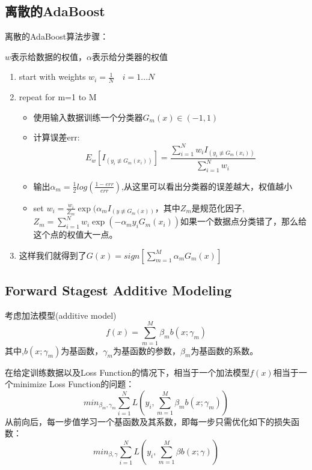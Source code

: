 	\subsection{离散的AdaBoost}
	离散的AdaBoost算法步骤：\boldmath  %

	$w$表示给数据的权值，$\alpha$表示给分类器的权值

	\begin{enumerate}		
		\item start with weights $w_i = \frac{1}{N} \quad i=1...N$
		\item repeat for m=1 to M
			\begin{itemize}
				\item 使用输入数据训练一个分类器$G_m(x) \in (-1,1)$
				\item 计算误差err:
					\begin{equation*}
						E_w[I_(y_i\not \equiv G_m(x_i))]=\frac{\sum_{i=1}^{N}w_i I_(y_i\not \equiv G_m(x_i))}{\sum_{i=1}^{N}w_i}
					\end{equation*}
				\item 输出$\alpha_m = \frac{1}{2}log(\frac{1-err}{err})$,从这里可以看出分类器的误差越大，权值越小
				\item set $w_i = \frac{w_i}{Z_m} \exp(\alpha_m I_(y\not \equiv G_m(x))$，其中$Z_m$是规范化因子,\newline
				$Z_m=\sum_{i=1}^{N}w_i \exp(-\alpha_m y_i G_m(x_i))$如果一个数据点分类错了，那么给这个点的权值大一点。
			\end{itemize}
		\item 这样我们就得到了$G(x)=sign[\sum_{m=1}^{M}\alpha_m G_m(x)]$
	\end{enumerate}
	
	
	\subsection{Forward Stagest Additive Modeling}

	考虑加法模型(additive model)\boldmath
	\begin{equation}
		f(x)=\sum_{m=1}^{M}\beta_{m}b(x;\gamma_{m})
	\end{equation}
	其中,$b(x;\gamma_{m})$为基函数，$\gamma_m$为基函数的参数，$\beta_m$为基函数的系数。

	在给定训练数据以及Loss Function的情况下，相当于一个加法模型$f(x)$相当于一个minimize Loss Function的问题：
	\begin{equation}
		min_{\beta_m,\gamma_m} \sum_{i=1}^{N}L(y_i,\sum_{m=1}^{M}\beta_{m}b(x;\gamma_{m}))
	\end{equation}
	从前向后，每一步值学习一个基函数及其系数，即每一步只需优化如下的损失函数：
	\begin{equation}
		min_{\beta,\gamma} \sum_{i=1}^{N}L(y_i,\sum_{m=1}^{M}\beta b(x;\gamma))
	\end{equation}
	\newline
	\newline

